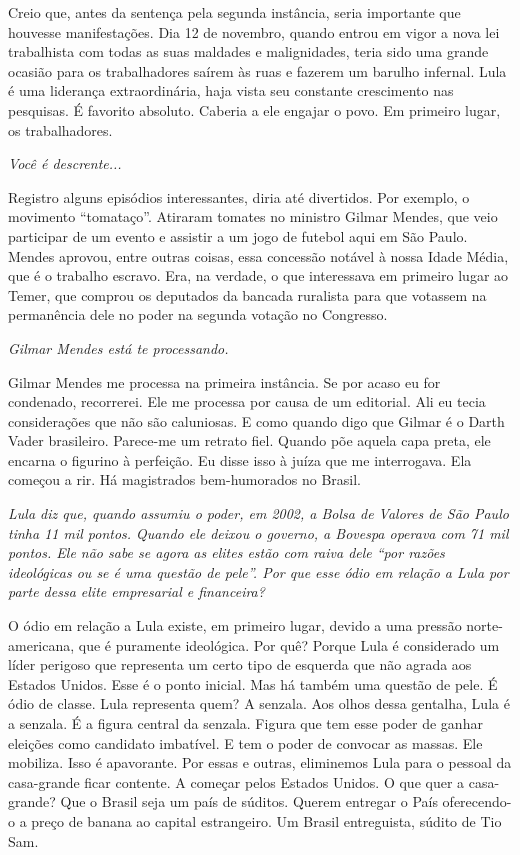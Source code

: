 \normalfont 
Creio que, antes da sentença pela segunda instância,
seria importante que houvesse manifestações. Dia 12 de novembro, quando
entrou em vigor a nova lei trabalhista com todas as suas maldades e
malignidades, teria sido uma grande ocasião para os trabalhadores saírem
às ruas e fazerem um barulho infernal. Lula é uma liderança
extraordinária, haja vista seu constante crescimento nas pesquisas. É
favorito absoluto. Caberia a ele engajar o povo. Em primeiro lugar, os
trabalhadores.

\itshape
 Você é descrente...

\normalfont 
Registro alguns episódios interessantes, diria até
divertidos. Por exemplo, o movimento ``tomataço''. Atiraram tomates no
ministro Gilmar Mendes, que veio participar de um evento e assistir a um
jogo de futebol aqui em São Paulo. Mendes aprovou, entre outras coisas,
essa concessão notável à nossa Idade Média, que é o trabalho escravo.
Era, na verdade, o que interessava em primeiro lugar ao Temer, que
comprou os deputados da bancada ruralista para que votassem na
permanência dele no poder na segunda votação no Congresso.

\itshape
 Gilmar Mendes está te processando.

\normalfont 
Gilmar Mendes me processa na primeira instância. Se por
acaso eu for condenado, recorrerei. Ele me processa por causa de um
editorial. Ali eu tecia considerações que não são caluniosas. E como
quando digo que Gilmar é o Darth Vader brasileiro. Parece-me um retrato
fiel. Quando põe aquela capa preta, ele encarna o figurino à perfeição.
Eu disse isso à juíza que me interrogava. Ela começou a rir. Há
magistrados bem-humorados no Brasil.

\itshape
 Lula diz que, quando assumiu o poder, em 2002, a Bolsa
de Valores de São Paulo tinha 11 mil pontos. Quando ele deixou o
governo, a Bovespa operava com 71 mil pontos. Ele não sabe se agora as
elites estão com raiva dele ``por razões ideológicas ou se é uma questão
de pele''. Por que esse ódio em relação a Lula por parte dessa elite
empresarial e financeira?

\normalfont 
O ódio em relação a Lula existe, em primeiro lugar,
devido a uma pressão norte-americana, que é puramente ideológica.
Por quê? Porque Lula é
considerado um líder perigoso que representa um certo tipo de esquerda
que não agrada aos Estados Unidos. Esse é o ponto inicial. Mas há também
uma questão de pele. É ódio de classe. Lula representa quem? A senzala.
Aos olhos dessa gentalha, Lula é a senzala. É a figura central da
senzala. Figura que tem esse poder de ganhar eleições como candidato
imbatível. E tem o poder de convocar as massas. Ele mobiliza. Isso é
apavorante. Por essas e outras, eliminemos Lula para o pessoal da
casa-grande ficar contente. A começar pelos Estados Unidos. O que quer a
casa-grande? Que o Brasil seja um país de súditos. Querem entregar o
País oferecendo-o a preço de banana ao capital estrangeiro. Um Brasil
entreguista, súdito de Tio Sam.

